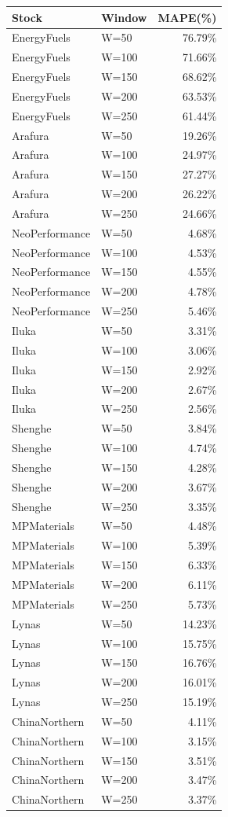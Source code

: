 \begin{tabular}{llr} \toprule
Stock & Window & MAPE(\%) \\ \midrule
EnergyFuels & W=50 & 76.79\% \\ 
EnergyFuels & W=100 & 71.66\% \\ 
EnergyFuels & W=150 & 68.62\% \\ 
EnergyFuels & W=200 & 63.53\% \\ 
EnergyFuels & W=250 & 61.44\% \\ 
Arafura & W=50 & 19.26\% \\ 
Arafura & W=100 & 24.97\% \\ 
Arafura & W=150 & 27.27\% \\ 
Arafura & W=200 & 26.22\% \\ 
Arafura & W=250 & 24.66\% \\ 
NeoPerformance & W=50 & 4.68\% \\ 
NeoPerformance & W=100 & 4.53\% \\ 
NeoPerformance & W=150 & 4.55\% \\ 
NeoPerformance & W=200 & 4.78\% \\ 
NeoPerformance & W=250 & 5.46\% \\ 
Iluka & W=50 & 3.31\% \\ 
Iluka & W=100 & 3.06\% \\ 
Iluka & W=150 & 2.92\% \\ 
Iluka & W=200 & 2.67\% \\ 
Iluka & W=250 & 2.56\% \\ 
Shenghe & W=50 & 3.84\% \\ 
Shenghe & W=100 & 4.74\% \\ 
Shenghe & W=150 & 4.28\% \\ 
Shenghe & W=200 & 3.67\% \\ 
Shenghe & W=250 & 3.35\% \\ 
MPMaterials & W=50 & 4.48\% \\ 
MPMaterials & W=100 & 5.39\% \\ 
MPMaterials & W=150 & 6.33\% \\ 
MPMaterials & W=200 & 6.11\% \\ 
MPMaterials & W=250 & 5.73\% \\ 
Lynas & W=50 & 14.23\% \\ 
Lynas & W=100 & 15.75\% \\ 
Lynas & W=150 & 16.76\% \\ 
Lynas & W=200 & 16.01\% \\ 
Lynas & W=250 & 15.19\% \\ 
ChinaNorthern & W=50 & 4.11\% \\ 
ChinaNorthern & W=100 & 3.15\% \\ 
ChinaNorthern & W=150 & 3.51\% \\ 
ChinaNorthern & W=200 & 3.47\% \\ 
ChinaNorthern & W=250 & 3.37\% \\ 
\bottomrule \end{tabular}